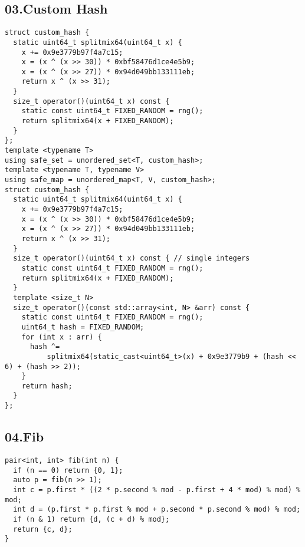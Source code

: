 \documentclass[twoside]{article}
\begin{document}
\begin{multicols*}{2}
{
\subsection*{03.Custom Hash}
}
\begin{verbatim}
struct custom_hash {
  static uint64_t splitmix64(uint64_t x) {
    x += 0x9e3779b97f4a7c15;
    x = (x ^ (x >> 30)) * 0xbf58476d1ce4e5b9;
    x = (x ^ (x >> 27)) * 0x94d049bb133111eb;
    return x ^ (x >> 31);
  }
  size_t operator()(uint64_t x) const {
    static const uint64_t FIXED_RANDOM = rng();
    return splitmix64(x + FIXED_RANDOM);
  }
};
template <typename T>
using safe_set = unordered_set<T, custom_hash>;
template <typename T, typename V>
using safe_map = unordered_map<T, V, custom_hash>;
struct custom_hash {
  static uint64_t splitmix64(uint64_t x) {
    x += 0x9e3779b97f4a7c15;
    x = (x ^ (x >> 30)) * 0xbf58476d1ce4e5b9;
    x = (x ^ (x >> 27)) * 0x94d049bb133111eb;
    return x ^ (x >> 31);
  }
  size_t operator()(uint64_t x) const { // single integers
    static const uint64_t FIXED_RANDOM = rng();
    return splitmix64(x + FIXED_RANDOM);
  }
  template <size_t N>
  size_t operator()(const std::array<int, N> &arr) const {
    static const uint64_t FIXED_RANDOM = rng();
    uint64_t hash = FIXED_RANDOM;
    for (int x : arr) {
      hash ^=
          splitmix64(static_cast<uint64_t>(x) + 0x9e3779b9 + (hash << 6) + (hash >> 2));
    }
    return hash;
  }
};
\end{verbatim}

{
\subsection*{04.Fib}
}
\begin{verbatim}
pair<int, int> fib(int n) {
  if (n == 0) return {0, 1};
  auto p = fib(n >> 1);
  int c = p.first * ((2 * p.second % mod - p.first + 4 * mod) % mod) % mod;
  int d = (p.first * p.first % mod + p.second * p.second % mod) % mod;
  if (n & 1) return {d, (c + d) % mod};
  return {c, d};
}
\end{verbatim}


\end{multicols*}
\end{document}
